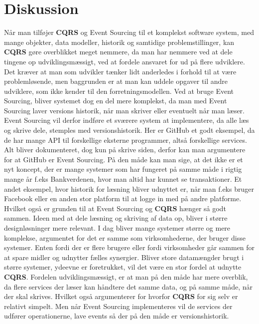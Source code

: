 \chapter{Diskussion}
Når man tilføjer \textbf{CQRS} og Event Sourcing til et komplekst software system, med mange objekter, data modeller, historik og samtidige problemstillinger, kan \textbf{CQRS} gøre overblikket meget nemmere, da man har nemmere ved at dele tingene op udviklingsmæssigt, ved at fordele ansvaret for ud på flere udviklere.
Det kræver at man som udvikler tænker lidt anderledes i forhold til at være problemløsende, men baggrunden er at man kan uddele opgaver til andre udviklere, som ikke kender til den forretningsmodellen.
Ved at bruge Event Sourcing, bliver systemet dog en del mere komplekst, da man med Event Sourcing laver versions historik, når man skriver eller eventuelt når man læser. Event Sourcing vil derfor indføre et sværere system at implementere, da alle læs og skrive dele, stemples med versionshistorik. Her er GitHub et godt eksempel, da de har mange API til forskellige eksterne programmer, altså forskellige services. Alt bliver dokumenteret, dog kun på skrive siden, derfor kan man argumentere for at GitHub er Event Sourcing.
På den måde kan man sige, at det ikke er et nyt koncept, der er mange systemer som har fungeret på samme måde i rigtig mange år f.eks Bankverdenen, hvor man altid har kunnet se transaktioner. Et andet eksempel, hvor historik for læsning bliver udnyttet er, når man f.eks bruger Facebook eller en anden stor platform til at logge in med på andre platforme.
Hvilket også er grunden til at Event Sourcing og \textbf{CQRS} hænger så godt sammen.
\newline
\newline
Ideen med at dele læsning og skriving af data op, bliver i større designløsninger mere relevant. 
I dag bliver mange systemer større og mere komplekse, argumentet for det er samme som virksomhederne, der bruger disse systemer. Enten fordi der er flere brugere eller fordi virksomheder går sammen for at spare midler og udnytter fælles synergier.
Bliver store datamængder brugt i større systemer, ydeevne er foretrukket, vil det være en stor fordel at udnytte \textbf{CQRS}. Fordelen udviklingsmæssigt, er at man på den måde har mere overblik, da flere services der læser kan håndtere det samme data, og på samme måde, når der skal skrives. Hvilket også argumenterer for hvorfor \textbf{CQRS} for sig selv er relativt simpelt. Men når Event Sourcing implementeres vil de services der udfører operationerne, lave events så der på den måde er versionshistorik.
